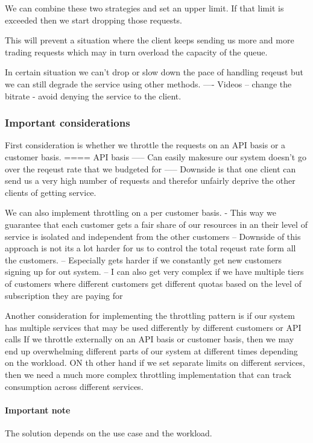 \documentclass[a4paper, 11pt]{book}
\begin{document}
    We can combine these two strategies and set an upper limit.
    If that limit is exceeded then we start dropping those requests.

    This will prevent a situation where the client keeps sending us more and more trading requests which may in turn overload the capacity of the queue.

    In certain situation we can't drop or slow down the pace of handling reqeust but we can still degrade the service using other methods.
    ---- Videos -- change the bitrate - avoid denying the service to the client.

    \subsubsection{Important considerations}
    First consideration is whether we throttle the requests on an API basis or a customer basis.
    ==== API basis
    ----- Can easily makesure our system doesn't go over the reqeust rate that we budgeted for
    ----- Downside is that one client can send us a very high number of requests and therefor unfairly deprive the other clients of getting service.

    We can also implement throttling on a per customer basis.
    - This way we guarantee that each customer gets a fair share of our resources in an their level of service is isolated and independent from the other customers
    -- Downside of this approach is not its a lot harder for us to control the total reqeust rate form all the customers.
    -- Especially gets harder if we constantly get new customers signing up for out system.
    -- I can also get very complex if we have multiple tiers of customers where different customers get different quotas based on the level of subscription they are paying for

    Another consideration for implementing the throttling pattern is if our system has multiple services that may be used differently by different customers or API calls
    If we throttle externally on an API basis or customer basis, then we may end up overwhelming different parts of our system at different times depending on the workload.
    ON th other hand if we set separate limits on different services, then we need a much more complex throttling implementation that can track consumption across different services.

    \paragraph{Important note}
    The solution depends on the use case and the workload.
\end{document}
